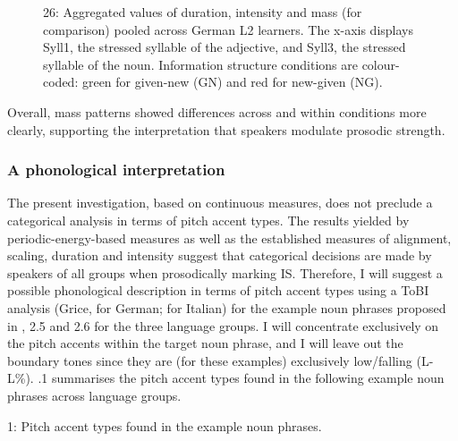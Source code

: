   
 

\begin{stylecaption}\begin{figure}
\caption{26: Aggregated values of duration, intensity and mass (for comparison) pooled across German L2 learners. The x-axis displays Syll1, the stressed syllable of the adjective, and Syll3, the stressed syllable of the noun. Information structure conditions are colour-coded: green for given-new (GN) and red for new-given (NG).}
\label{fig:key:2}
\end{figure}\end{stylecaption}

Overall, mass patterns showed differences across and within conditions more clearly, supporting the interpretation that speakers modulate prosodic strength.

\subsubsection{A phonological interpretation}
\hypertarget{Toc191305920}{}
The present investigation, based on continuous measures, does not preclude a categorical analysis in terms of pitch accent types. The results yielded by periodic-energy-based measures as well as the established measures of alignment, scaling, duration and intensity suggest that categorical decisions are made by speakers of all groups when prosodically marking IS. Therefore, I will suggest a possible phonological description in terms of pitch accent types using a ToBI analysis (Grice, \citealt{BaumannBenzmüller2005} for German; \citealt{GriceEtAl2005} for Italian) for the example noun phrases proposed in , 2.5 and 2.6 for the three language groups. I will concentrate exclusively on the pitch accents within the target noun phrase, and I will leave out the boundary tones since they are (for these examples) exclusively low/falling (L-L\%). .1 summarises the pitch accent types found in the following example noun phrases across language groups.

\begin{stylelsTableHeading}%
\begin{table}
\caption{1: Pitch accent types found in the example noun phrases.}
\label{tab:key:9}
\end{table}\end{stylelsTableHeading}



